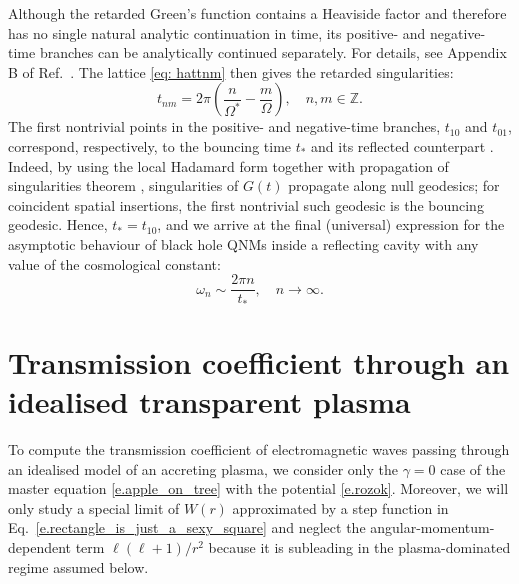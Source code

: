 \documentclass[prd,aps,twocolumn,amsfonts,showpacs,superscriptaddress,preprintnumbers,nofootinbib]{revtex4-2}
\begin{document}
Although the retarded Green's function contains a Heaviside factor and therefore has no single natural analytic continuation in time, its positive- and negative-time branches can be analytically continued separately. For details, see Appendix B of Ref.~\cite{Grozdanov:2026cut}. The lattice \eqref{eq: hattnm} then gives the retarded singularities:
\begin{equation}
\label{eq: tnm}
    t_{nm}=2\pi\left(\frac{n}{\Omega^*}-\frac{m}{\Omega}\right),
    \quad n,m\in\mathbb Z .
\end{equation}
The first nontrivial points in the positive- and negative-time branches, $t_{10}$ and $t_{01}$, correspond, respectively, to the bouncing time $t_*$ and its reflected counterpart \cite{Dodelson:2025jff,Grozdanov:2026cut}. Indeed, by using the local Hadamard form together with propagation of singularities theorem \cite{Grozdanov:2026ktq}, singularities of $G(t)$ propagate along null geodesics; for coincident spatial insertions, the first nontrivial such geodesic is the bouncing geodesic. Hence, $t_*=t_{10}$, and we arrive at the final (universal) expression for the asymptotic behaviour of black hole QNMs inside a reflecting cavity with any value of the cosmological constant:
\begin{equation}
    \omega_n\sim\frac{2\pi n}{t_*},\quad n\to\infty .
\end{equation}


\section{Transmission coefficient through an idealised transparent plasma}\label{a.WKBB}

To compute the transmission coefficient of electromagnetic waves passing through an idealised model of an accreting plasma, we consider only the $\gamma=0$ case of the master equation \eqref{e.apple_on_tree} with the potential \eqref{e.rozok}. Moreover, we will only study a special limit of $W(r)$ approximated by a step function in Eq.~\eqref{e.rectangle_is_just_a_sexy_square} and neglect the angular-momentum-dependent term $\ell(\ell+1)/r^2$ because it is subleading in the plasma-dominated regime assumed below.
\end{document}

